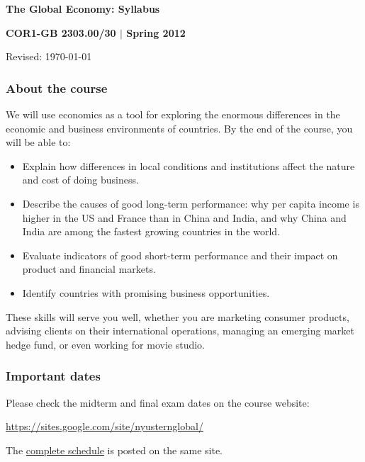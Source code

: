 \documentclass[12pt]{article}
\begin{document}
\thispagestyle{empty}
\bigskipamount
\Head
\centerline{\large\bf The Global Economy:  Syllabus}
\vspace{1mm}
\centerline{\large\bf COR1-GB 2303.00/30 $|$ Spring 2012}
\vspace{1mm}
\centerline{Revised:  \today}

\subsubsection*{About the course}

We will use economics as a tool for exploring the enormous
differences in the economic and business environments of
countries. By the end of the course, you will be able to:
%
\begin{itemize}
\item Explain how differences in local conditions
and institutions
affect the nature and cost of doing business.

\item Describe the causes of good long-term performance: why per
capita income is higher in the US and France than in China and India,
and why China and India are among the fastest growing countries in the
world.

\item Evaluate indicators of good short-term performance
and their impact on product and financial markets.

\item Identify countries with promising business opportunities.

\end{itemize}
%
These skills will serve you well, whether you are
marketing consumer products,
advising clients on their international operations,
managing an emerging market hedge fund,
or even working for movie studio.


\subsubsection*{Important dates}

Please check the midterm and final exam dates on the course website:  \\

\centerline{\url{https://sites.google.com/site/nyusternglobal/}}

The
\href{https://sites.google.com/site/nyusternglobal/home/outline}{complete schedule}
is posted on the same site.
\end{document}
